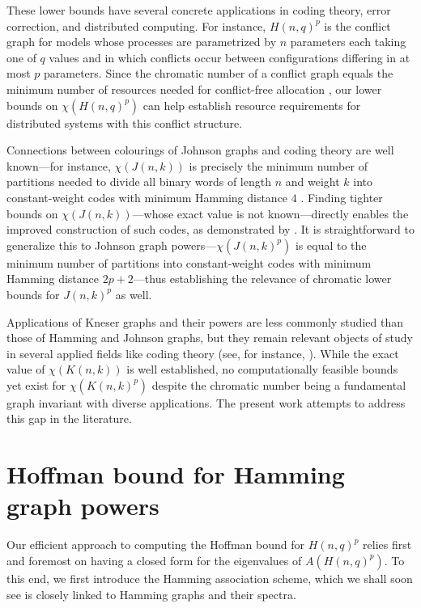 \documentclass{article}
\numberwithin{equation}{section}
\theoremstyle{plain}
\begin{document}
These lower bounds have several concrete applications in coding theory, error correction, and distributed computing. For instance, $H(n, q)^p$ is the conflict graph for models whose processes are parametrized by $n$ parameters each taking one of $q$ values and in which conflicts occur between configurations differing in at most $p$ parameters. Since the chromatic number of a conflict graph equals the minimum number of resources needed for conflict-free allocation \cite{BNBH+98}, our lower bounds on $\chi(H(n, q)^p)$ can help establish resource requirements for distributed systems with this conflict structure.

Connections between colourings of Johnson graphs and coding theory are well known---for instance, $\chi(J(n, k))$ is precisely the minimum number of partitions needed to divide all binary words of length $n$ and weight $k$ into constant-weight codes with minimum Hamming distance $4$ \cite{EB96}. Finding tighter bounds on $\chi(J(n, k))$---whose exact value is not known---directly enables the improved construction of such codes, as demonstrated by \cite{BE11}. It is straightforward to generalize this to Johnson graph powers---$\chi(J(n, k)^p)$ is equal to the minimum number of partitions into constant-weight codes with minimum Hamming distance $2p + 2$---thus establishing the relevance of chromatic lower bounds for $J(n, k)^p$ as well.

Applications of Kneser graphs and their powers are less commonly studied than those of Hamming and Johnson graphs, but they remain relevant objects of study in several applied fields like coding theory (see, for instance, \cite{CHMv24}). While the exact value of $\chi(K(n, k))$ is well established, no computationally feasible bounds yet exist for $\chi(K(n, k)^p)$ despite the chromatic number being a fundamental graph invariant with diverse applications. The present work attempts to address this gap in the literature.

\section{Hoffman bound for Hamming graph powers}\label{section:3}

Our efficient approach to computing the Hoffman bound for $H(n, q)^p$ relies first and foremost on having a closed form for the eigenvalues of $A(H(n, q)^p)$. To this end, we first introduce the Hamming association scheme, which we shall soon see is closely linked to Hamming graphs and their spectra.
\end{document}
